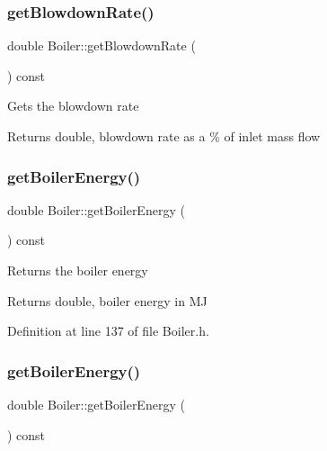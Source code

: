 \subsubsection{\texorpdfstring{get\+Blowdown\+Rate()}{getBlowdownRate()}\hspace{0.1cm}{\footnotesize\ttfamily [3/3]}}
{\footnotesize\ttfamily double Boiler\+::get\+Blowdown\+Rate (\begin{DoxyParamCaption}{ }\end{DoxyParamCaption}) const}

Gets the blowdown rate \begin{DoxyReturn}{Returns}
double, blowdown rate as a \% of inlet mass flow 
\end{DoxyReturn}
\mbox{\label{class_boiler_a8cc9ad5f1b36f5dcbcb225e9e3d13a39}} 
\subsubsection{\texorpdfstring{get\+Boiler\+Energy()}{getBoilerEnergy()}\hspace{0.1cm}{\footnotesize\ttfamily [1/3]}}
{\footnotesize\ttfamily double Boiler\+::get\+Boiler\+Energy (\begin{DoxyParamCaption}{ }\end{DoxyParamCaption}) const\hspace{0.3cm}{\ttfamily [inline]}}

Returns the boiler energy \begin{DoxyReturn}{Returns}
double, boiler energy in MJ 
\end{DoxyReturn}


Definition at line 137 of file Boiler.\+h.

\mbox{\label{class_boiler_a8cc9ad5f1b36f5dcbcb225e9e3d13a39}} 
\subsubsection{\texorpdfstring{get\+Boiler\+Energy()}{getBoilerEnergy()}\hspace{0.1cm}{\footnotesize\ttfamily [2/3]}}
{\footnotesize\ttfamily double Boiler\+::get\+Boiler\+Energy (\begin{DoxyParamCaption}{ }\end{DoxyParamCaption}) const\hspace{0.3cm}{\ttfamily [inline]}}

